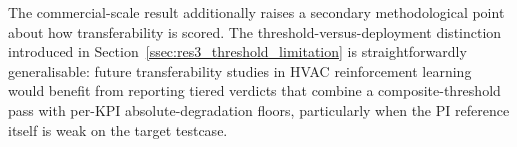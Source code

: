 The \boptest{} commercial-scale result additionally raises a secondary
methodological point about how transferability is scored. The
threshold-versus-deployment distinction introduced in
Section~\ref{ssec:res3_threshold_limitation} is straightforwardly
generalisable: future transferability studies in HVAC reinforcement
learning would benefit from reporting tiered verdicts that combine a
composite-threshold pass with per-KPI absolute-degradation floors,
particularly when the PI reference itself is weak on the target
testcase.
